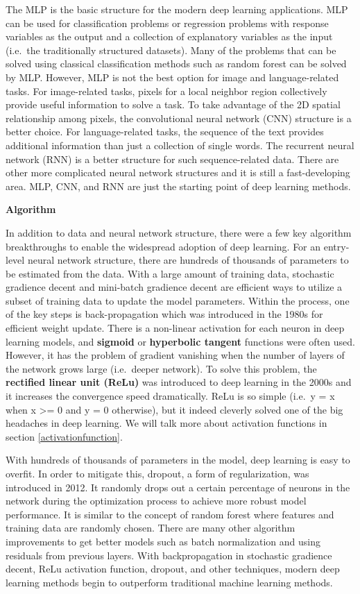 \documentclass[12pt,]{krantz}
\begin{document}
The MLP is the basic structure for the modern deep learning applications. MLP can be used for classification problems or regression problems with response variables as the output and a collection of explanatory variables as the input (i.e.~the traditionally structured datasets). Many of the problems that can be solved using classical classification methods such as random forest can be solved by MLP. However, MLP is not the best option for image and language-related tasks. For image-related tasks, pixels for a local neighbor region collectively provide useful information to solve a task. To take advantage of the 2D spatial relationship among pixels, the convolutional neural network (CNN) structure is a better choice. For language-related tasks, the sequence of the text provides additional information than just a collection of single words. The recurrent neural network (RNN) is a better structure for such sequence-related data. There are other more complicated neural network structures and it is still a fast-developing area. MLP, CNN, and RNN are just the starting point of deep learning methods.

\textbf{Algorithm}

In addition to data and neural network structure, there were a few key algorithm breakthroughs to enable the widespread adoption of deep learning. For an entry-level neural network structure, there are hundreds of thousands of parameters to be estimated from the data. With a large amount of training data, stochastic gradience decent and mini-batch gradience decent are efficient ways to utilize a subset of training data to update the model parameters. Within the process, one of the key steps is back-propagation which was introduced in the 1980s for efficient weight update. There is a non-linear activation for each neuron in deep learning models, and \textbf{sigmoid} or \textbf{hyperbolic tangent} functions were often used. However, it has the problem of gradient vanishing when the number of layers of the network grows large (i.e.~deeper network). To solve this problem, the \textbf{rectified linear unit (ReLu)} was introduced to deep learning in the 2000s and it increases the convergence speed dramatically. ReLu is so simple (i.e.~y = x when x \textgreater{}= 0 and y = 0 otherwise), but it indeed cleverly solved one of the big headaches in deep learning. We will talk more about activation functions in section \ref{activationfunction}.

With hundreds of thousands of parameters in the model, deep learning is easy to overfit. In order to mitigate this, dropout, a form of regularization, was introduced in 2012. It randomly drops out a certain percentage of neurons in the network during the optimization process to achieve more robust model performance. It is similar to the concept of random forest where features and training data are randomly chosen. There are many other algorithm improvements to get better models such as batch normalization and using residuals from previous layers. With backpropagation in stochastic gradience decent, ReLu activation function, dropout, and other techniques, modern deep learning methods begin to outperform traditional machine learning methods.
\end{document}
